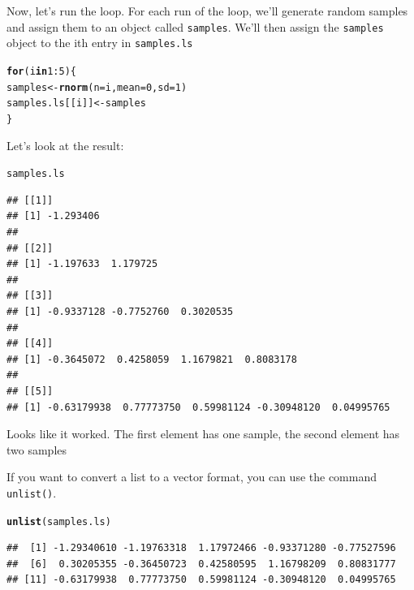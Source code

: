 \documentclass{tufte-book}\usepackage[]{graphicx}\usepackage[]{color}
\makeatletter
\newcommand{\hlnum}[1]{\textcolor[rgb]{0.686,0.059,0.569}{#1}}%
\newcommand{\hlopt}[1]{\textcolor[rgb]{0,0,0}{#1}}%
\newcommand{\hlstd}[1]{\textcolor[rgb]{0.345,0.345,0.345}{#1}}%
\newcommand{\hlkwa}[1]{\textcolor[rgb]{0.161,0.373,0.58}{\textbf{#1}}}%
\newcommand{\hlkwb}[1]{\textcolor[rgb]{0.69,0.353,0.396}{#1}}%
\newcommand{\hlkwc}[1]{\textcolor[rgb]{0.333,0.667,0.333}{#1}}%
\newcommand{\hlkwd}[1]{\textcolor[rgb]{0.737,0.353,0.396}{\textbf{#1}}}%
\newenvironment{kframe}{%
 \def\at@end@of@kframe{}%
 \ifinner\ifhmode%
  \def\at@end@of@kframe{\end{minipage}}%
  \begin{minipage}{\columnwidth}%
 \fi\fi%
 \def\FrameCommand##1{\hskip\@totalleftmargin \hskip-\fboxsep
 \colorbox{shadecolor}{##1}\hskip-\fboxsep
     \hskip-\linewidth \hskip-\@totalleftmargin \hskip\columnwidth}%
 \MakeFramed {\advance\hsize-\width
   \@totalleftmargin\z@ \linewidth\hsize
   \@setminipage}}%
 {\par\unskip\endMakeFramed%
 \at@end@of@kframe}
\newenvironment{knitrout}{}{} %
\makeatother
\begin{document}
\begin{footnotesize}
Now, let's run the loop. For each run of the loop, we'll generate random samples and assign them to an object called \texttt{samples}. We'll then assign the \texttt{samples} object to the ith entry in \texttt{samples.ls}

\begin{knitrout}
\color{fgcolor}\begin{kframe}
\begin{alltt}
\hlkwa{for}\hlstd{(i} \hlkwa{in} \hlnum{1}\hlopt{:}\hlnum{5}\hlstd{) \{}
  \hlstd{samples} \hlkwb{<-} \hlkwd{rnorm}\hlstd{(}\hlkwc{n} \hlstd{= i,} \hlkwc{mean} \hlstd{=} \hlnum{0}\hlstd{,} \hlkwc{sd} \hlstd{=} \hlnum{1}\hlstd{)}
  \hlstd{samples.ls[[i]]} \hlkwb{<-} \hlstd{samples}
\hlstd{\}}
\end{alltt}
\end{kframe}
\end{knitrout}

Let's look at the result:

\begin{knitrout}
\color{fgcolor}\begin{kframe}
\begin{alltt}
\hlstd{samples.ls}
\end{alltt}
\begin{verbatim}
## [[1]]
## [1] -1.293406
## 
## [[2]]
## [1] -1.197633  1.179725
## 
## [[3]]
## [1] -0.9337128 -0.7752760  0.3020535
## 
## [[4]]
## [1] -0.3645072  0.4258059  1.1679821  0.8083178
## 
## [[5]]
## [1] -0.63179938  0.77773750  0.59981124 -0.30948120  0.04995765
\end{verbatim}
\end{kframe}
\end{knitrout}

Looks like it worked. The first element has one sample, the second element has two samples

If you want to convert a list to a vector format, you can use the command \texttt{unlist()}.

\begin{knitrout}
\color{fgcolor}\begin{kframe}
\begin{alltt}
\hlkwd{unlist}\hlstd{(samples.ls)}
\end{alltt}
\begin{verbatim}
##  [1] -1.29340610 -1.19763318  1.17972466 -0.93371280 -0.77527596
##  [6]  0.30205355 -0.36450723  0.42580595  1.16798209  0.80831777
## [11] -0.63179938  0.77773750  0.59981124 -0.30948120  0.04995765
\end{verbatim}
\end{kframe}
\end{knitrout}


\end{footnotesize}
\end{document}
